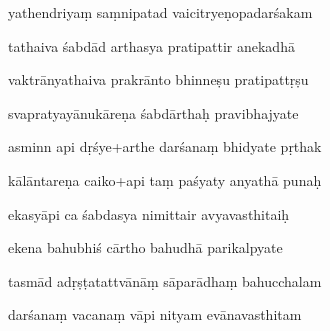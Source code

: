 \documentclass[article,12pt,a4paper]{memoir}%
\newcounter{parCount}
\begin{document}
	  
	  \pstart {} yathendriyaṃ saṃnipatad vaicitryeṇopadarśakam 
	{}
	\pend%
      

	  
	  \pstart \leavevmode%
	tathaiva śabdād arthasya pratipattir anekadhā 
	{}
	\pend%
      

	  
	  \pstart {} vaktrānyathaiva prakrānto bhinneṣu pratipattṛṣu 
	{}
	\pend%
      

	  
	  \pstart \leavevmode%
	svapratyayānukāreṇa śabdārthaḥ pravibhajyate 
	{}
	\pend%
      

	  
	  \pstart {} asminn api dṛśye+arthe darśanaṃ bhidyate pṛthak 
	{}
	\pend%
      

	  
	  \pstart \leavevmode%
	kālāntareṇa caiko+api taṃ paśyaty anyathā punaḥ 
	{}
	\pend%
      

	  
	  \pstart {} ekasyāpi ca śabdasya nimittair avyavasthitaiḥ 
	{}
	\pend%
      

	  
	  \pstart \leavevmode%
	ekena bahubhiś cārtho bahudhā parikalpyate 
	{}
	\pend%
      

	  
	  \pstart {} tasmād adṛṣṭatattvānāṃ sāparādhaṃ bahucchalam 
	{}
	\pend%
      

	  
	  \pstart \leavevmode%
	darśanaṃ vacanaṃ vāpi nityam evānavasthitam 
	{}
	\pend%
      
\end{document}
